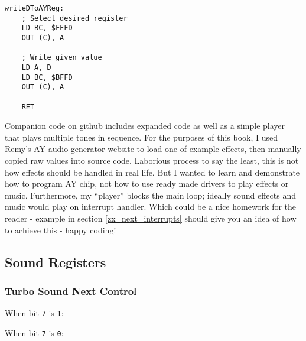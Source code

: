 \begin{lstlisting}
writeDToAYReg:
    ; Select desired register
    LD BC, $FFFD
    OUT (C), A
	
    ; Write given value
    LD A, D
    LD BC, $BFFD
    OUT (C), A
	
    RET
\end{lstlisting}

Companion code on github includes expanded code as well as a simple player that plays multiple tones in sequence. For the purposes of this book, I used Remy's AY audio generator website to load one of example effects, then manually copied raw values into source code. Laborious process to say the least, this is not how effects should be handled in real life. But I wanted to learn and demonstrate how to program AY chip, not how to use ready made drivers to play effects or music. Furthermore, my ``player'' blocks the main loop; ideally sound effects and music would play on interrupt handler. Which could be a nice homework for the reader - example in section \ref{zx_next_interrupts} should give you an idea of how to achieve this - happy coding!


\pagebreak
\subsection{Sound Registers}

\subsubsection{Turbo Sound Next Control }

When bit {\tt 7} is {\tt 1}:

\begin{NextPort}
\end{NextPort}

When bit {\tt 7} is {\tt 0}:

\begin{NextPort}
\end{NextPort}



